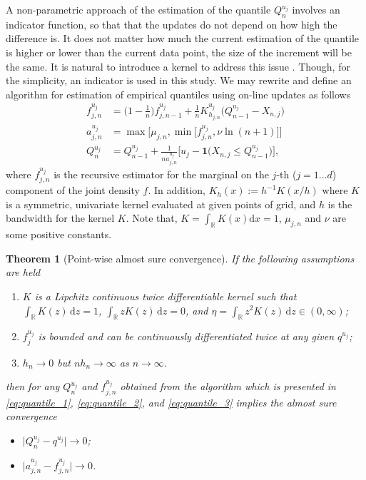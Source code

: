 \documentclass[12pt]{article}
\newtheorem{theorem}{Theorem}
\begin{document}
	A non-parametric approach of the estimation of the quantile $ Q^{u_j}_n $ involves an indicator function, so that that the updates do not depend on how high the difference is. It does not matter how much the current estimation of the quantile is higher or lower than the current data point, the size of the increment will be the same. It is natural to introduce a kernel to address this issue \parencite{Amiri2014}. Though, for the simplicity, an indicator is used in this study.  We may rewrite and define an algorithm for estimation of empirical quantiles using on-line updates as follows
	\begin{align}
		f^{u_j}_{j, n} &= \bigg(1- \frac{1}{n}\bigg) f^{u_j}_{j, n-1} + \frac{1}{n} K^{u_j}_{h_{j, n}}\big(Q^{u_j}_{n-1} - X_{n, j}\big) \label{eq:quantile_1} \\
		a^{u_j}_{j, n} &= \max\Big[\mu_{j, n}, \min\big[f^{u_j}_{j, n}, \nu \ln(n+1)\big]\Big] \label{eq:quantile_2} \\
		Q^{u_j}_n &= Q^{u_j}_{n-1} + \frac{1}{n a^{u_j}_{j, n}}\Big[u_j - \mathbf{1}\big(X_{n, j}\leq Q^{u_j}_{n-1}\big)\Big], \label{eq:quantile_3}
	\end{align}
	where $ f^{u_j}_{j, n} $ is the recursive estimator for the marginal on the $ j $-th ($ j=1\dots d $) component of the joint density $ f $. In addition, $ K_h(x) := h^{-1}K(x/h) $ where $ K $ is a symmetric, univariate kernel evaluated at given points of grid, and $ h $ is the bandwidth for the kernel $ K $. Note that, $ K = \int_{\mathbb{R}}K(x)\text{d}x=1 $, $ \mu_{j, n} $ and $ \nu $ are some positive constants.
	
	\begin{theorem}[Point-wise almost sure convergence]\label{thm:almost_sure_convergence}
		If the following assumptions are held
		\begin{enumerate}
			\item $ K $ is a Lipchitz continuous twice differentiable kernel such that $ \int_\mathbb{R} K(z)\, \text{d}z = 1 $, $ \int_\mathbb{R} zK(z)\, \text{d}z = 0 $, and $\eta = \int_\mathbb{R} z^2K(z)\, \text{d}z \in (0, \infty) $;
			\item $ f^{u_j}_j $ is bounded and can be continuously differentiated twice at any given $ q^{u_j} $;
			\item $ h_n \rightarrow 0 $ but $ nh_n \rightarrow \infty $ as $ n\rightarrow \infty $.
		\end{enumerate}
		then for any $ Q^{u_j}_n $ and $ f^{u_j}_{j, n} $ obtained from the algorithm which is presented in \eqref{eq:quantile_1}, \eqref{eq:quantile_2}, and \eqref{eq:quantile_3} implies the almost sure convergence
		\begin{itemize}
			\item[a. ] $ \big|Q^{u_j}_n - q^{u_j}\big| \rightarrow 0 $;
			\item[b. ] $ \big|a^{u_j}_{j, n} - f^{u_j}_{j, n}\big| \rightarrow 0 $.
		\end{itemize}
	\end{theorem}
	
\end{document}
